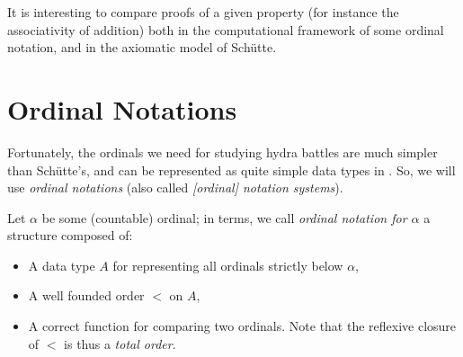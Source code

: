 



It is interesting to compare proofs of a given property (for instance the associativity of addition) both in the computational framework of some ordinal notation, and in the axiomatic model of Schütte.

\section{Ordinal Notations}


Fortunately, the ordinals we need for  studying hydra battles are much simpler than Schütte's, and can be represented as quite simple data types in \gallina. So, we will use \emph{ordinal notations} (also called \emph{[ordinal] notation systems}). 

Let $\alpha$ be some (countable) ordinal; 
in \coq{} terms, we call \emph{ordinal notation for $\alpha$} a structure composed 
of:
\begin{itemize}
\item A data type $A$ for representing all ordinals strictly below $\alpha$,
\item A well founded order $<$ on $A$, 
\item A correct function for comparing two ordinals. Note  that the reflexive closure of $<$ is thus a \emph{total order}.
\end{itemize}


